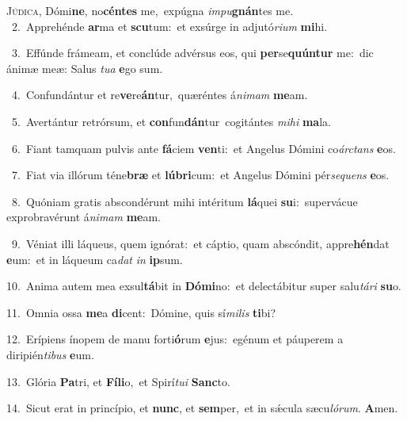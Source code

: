 \lettrine{\initial\textcolor{\initialcolor}{J}}{údica,} Dómi\-\textbf{ne}\-, no\-\textbf{cén}\-\textbf{tes} me,~\star expúgna \textit{im}\-\textit{pu}\textbf{gnán}tes me.\\
{\numbfont\textcolor{\numbcolor}{~2.}}~Apprehénde \textbf{ar}\-ma et \textbf{scu}\-tum:~\star et exsúrge in adjutó\-\textit{ri}\-\textit{um} \textbf{mi}\-hi.\par
{\numbfont\textcolor{\numbcolor}{~3.}}~Effúnde frámeam, et conclúde advérsus eos, qui \textbf{per}\-se\-\textbf{quún}\-\textbf{tur} me:~\star dic ánimæ meæ: Salus \textit{tu}\-\textit{a} \textbf{e}\-go sum.\par
{\numbfont\textcolor{\numbcolor}{~4.}}~Confundántur et re\-\textbf{ve}\-re\-\textbf{án}\-tur,~\star quæréntes á\-\textit{ni}\-\textit{mam} \textbf{me}\-am.\par
{\numbfont\textcolor{\numbcolor}{~5.}}~Avertántur retrórsum, et \textbf{con}\-fun\-\textbf{dán}\-tur~\star cogitántes \textit{mi}\-\textit{hi} \textbf{ma}\-la.\par
{\numbfont\textcolor{\numbcolor}{~6.}}~Fiant tamquam pulvis ante \textbf{fá}\-ciem \textbf{ven}\-ti:~\star et Angelus Dómini co\-\textit{árc}\-\textit{tans} \textbf{e}\-os.\par
{\numbfont\textcolor{\numbcolor}{~7.}}~Fiat via illórum téne\textbf{bræ} et \textbf{lú}\-\textbf{bri}cum:~\star et Angelus Dómini pér\-\textit{se}\-\textit{quens} \textbf{e}\-os.\par
{\numbfont\textcolor{\numbcolor}{~8.}}~Quóniam gratis abscondérunt mihi intéritum \textbf{lá}\-quei \textbf{su}\-i:~\star supervácue exprobravérunt á\-\textit{ni}\-\textit{mam} \textbf{me}\-am.\par
{\numbfont\textcolor{\numbcolor}{~9.}}~Véniat illi láqueus, quem ignórat:~\dagger et cáptio, quam abscóndit, appre\-\textbf{hén}\-dat \textbf{e}\-um:~\star et in láqueum ca\textit{dat} \textit{in} \textbf{ip}\-sum.\par
{\numbfont\textcolor{\numbcolor}{10.}}~Anima autem mea exsul\-\textbf{tá}\-bit in \textbf{Dó}\-\textbf{mi}no:~\star et delectábitur super salu\-\textit{tá}\-\textit{ri} \textbf{su}\-o.\par
{\numbfont\textcolor{\numbcolor}{11.}}~Omnia ossa \textbf{me}\-a \textbf{di}\-cent:~\star Dómine, quis sí\-\textit{mi}\-\textit{lis} \textbf{ti}\-bi?\par
{\numbfont\textcolor{\numbcolor}{12.}}~Erípiens ínopem de manu forti\-\textbf{ó}\-rum \textbf{e}\-jus:~\star egénum et páuperem a diripién\-\textit{ti}\-\textit{bus} \textbf{e}\-um.\par
{\numbfont\textcolor{\numbcolor}{13.}}~Glória \textbf{Pa}\-tri, et \textbf{Fí}\-\textbf{li}o,~\star et Spirí\-\textit{tu}\-\textit{i} \textbf{Sanc}\-to.\par
{\numbfont\textcolor{\numbcolor}{14.}}~Sicut erat in princípio, et \textbf{nunc}\-, et \textbf{sem}\-per,~\star et in sǽcula sæcu\-\textit{ló}\-\textit{rum}. \textbf{A}\-men.\par
